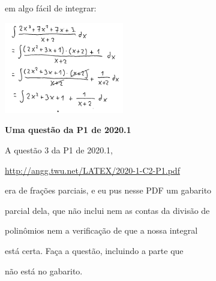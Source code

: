 \documentclass[oneside,12pt]{article}
\begin{document}
em algo fácil de integrar:

\msk

\includegraphics[height=4cm]{2020-1-C2/20201119_C2_div_com_resto_4.pdf}


\newpage


{\bf Uma questão da P1 de 2020.1}

A questão 3 da P1 de 2020.1,

\ssk

\url{http://angg.twu.net/LATEX/2020-1-C2-P1.pdf}

\ssk

era de frações parciais, e eu pus nesse PDF um gabarito

parcial dela, que não inclui nem as contas da divisão de

polinômios nem a verificação de que a nossa integral

está certa. Faça a questão, incluindo a parte que

não está no gabarito.




\end{document}
